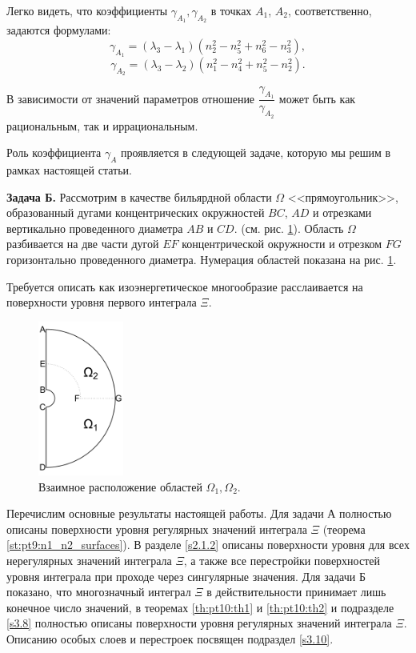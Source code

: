 Легко видеть, что коэффициенты $\gamma_{A_1}, \gamma_{A_2}$ в точках $A_1$, $A_2$, соответственно, задаются формулами:
$$\gamma_{A_1} = (\lambda_3 - \lambda_1)(n_2^2 - n_5^2 + n_6^2 - n_3^2),$$
$$\gamma_{A_2} = (\lambda_3 - \lambda_2)(n_1^2 - n_4^2 + n_5^2 - n_2^2).$$

В зависимости от значений параметров отношение $\dfrac{\gamma_{A_1}}{\gamma_{A_2}}$ может быть как рациональным, так и иррациональным.

Роль коэффициента $\gamma_A$ проявляется в следующей задаче, которую мы решим в рамках настоящей статьи.

\textbf{Задача Б.} Рассмотрим в качестве бильярдной области $\Omega$  <<прямоугольник>>, образованный дугами концентрических окружностей $BC$, $AD$ и отрезками вертикально проведенного диаметра $AB$ и $CD$. (см. рис. \ref{fig:pt8:_example9}).
Область $\Omega$ разбивается на две части дугой  $EF$ концентрической окружности  и отрезком $FG$ горизонтально проведенного диаметра. Нумерация областей показана на рис. \ref{fig:pt8:_example9}.

Требуется описать как изоэнергетическое многообразие расслаивается на поверхности уровня первого интеграла $\Xi$.


\begin{figure}[!htb]
\centering
   \includegraphics[width=0.25\textwidth]{images/section1/imgB.pdf}   
    \caption{Взаимное расположение областей $\Omega_1, \Omega_2$.}
    \label{fig:pt8:_example9}
\end{figure}

Перечислим основные результаты настоящей работы.
Для задачи А полностью описаны поверхности уровня регулярных значений интеграла $\Xi$ (теорема \ref{st:pt9:n1_n2_surfaces}).
В разделе \ref{s2.1.2}  описаны поверхности уровня для всех нерегулярных значений интеграла $\Xi$, а также все перестройки поверхностей уровня интеграла при проходе через сингулярные значения. 
Для задачи Б  показано, что многозначный интеграл $\Xi$ в действительности принимает лишь конечное число значений, в теоремах \ref{th:pt10:th1} и \ref{th:pt10:th2} и подразделе \ref{s3.8} полностью описаны поверхности уровня регулярных значений интеграла $\Xi$.
Описанию особых слоев и перестроек посвящен подраздел \ref{s3.10}.
\bigskip

